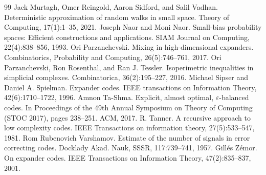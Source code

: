 \documentclass[10pt,a4paper]{article}
\begin{document}
\begin{thebibliography}{99}
 Jack Murtagh, Omer Reingold, Aaron Sidford, and Salil Vadhan. Deterministic approximation of random walks in small space. Theory of Computing, 17(1):1–35, 2021.
 Joseph Naor and Moni Naor. Small-bias probability spaces: Efficient constructions and applications. SIAM Journal on Computing, 22(4):838–856, 1993.
 Ori Parzanchevski. Mixing in high-dimensional expanders. Combinatorics, Probability and Computing, 26(5):746–761, 2017.
 Ori Parzanchevski, Ron Rosenthal, and Ran J. Tessler. Isoperimetric inequalities in simplicial complexes. Combinatorica, 36(2):195–227, 2016.
 Michael Sipser and Daniel A. Spielman. Expander codes. IEEE transactions on Information Theory, 42(6):1710–1722, 1996.
 Amnon Ta-Shma. Explicit, almost optimal, \(\varepsilon\)-balanced codes. In Proceedings of the 49th Annual Symposium on Theory of Computing (STOC 2017), pages 238–251. ACM, 2017.
 R. Tanner. A recursive approach to low complexity codes. IEEE Transactions on information theory, 27(5):533–547, 1981.
 Rom Rubenovich Varshamov. Estimate of the number of signals in error correcting codes. Docklady Akad. Nauk, SSSR, 117:739–741, 1957.
 Gillés Zémor. On expander codes. IEEE Transactions on Information Theory, 47(2):835–837, 2001.
\end{thebibliography}
\end{document}
